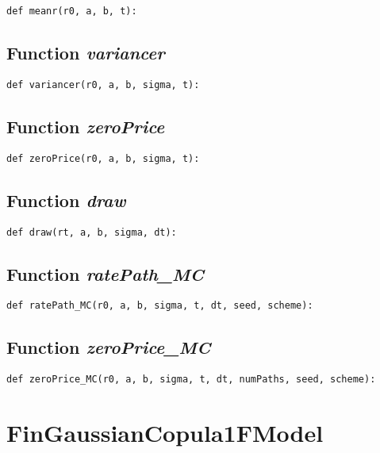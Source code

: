\documentclass[twoside,11pt]{book}
\begin{document}
\begin{lstlisting}
def meanr(r0, a, b, t):
\end{lstlisting}

\subsection{Function {\it variancer}}


\begin{lstlisting}
def variancer(r0, a, b, sigma, t):
\end{lstlisting}

\subsection{Function {\it zeroPrice}}


\begin{lstlisting}
def zeroPrice(r0, a, b, sigma, t):
\end{lstlisting}

\subsection{Function {\it draw}}


\begin{lstlisting}
def draw(rt, a, b, sigma, dt):
\end{lstlisting}

\subsection{Function {\it ratePath\_MC}}


\begin{lstlisting}
def ratePath_MC(r0, a, b, sigma, t, dt, seed, scheme):
\end{lstlisting}

\subsection{Function {\it zeroPrice\_MC}}


\begin{lstlisting}
def zeroPrice_MC(r0, a, b, sigma, t, dt, numPaths, seed, scheme):
\end{lstlisting}

\newpage
\section{FinGaussianCopula1FModel}
\end{document}
